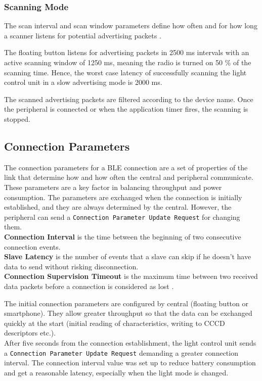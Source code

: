         \subsubsection{Scanning Mode} 
            The scan interval and scan window parameters define how often and for how long a scanner listens for potential advertising packets \cite[20]{ble_book}.
            
            The floating button listens for advertising packets in 2500 ms intervals with an active scanning window of 1250 ms, meaning the radio is turned on 50 \% of the scanning time. 
            Hence, the worst case latency of successfully scanning the light control unit in a slow advertising mode is 2000 ms.
            
            The scanned advertising packets are filtered according to the device name. Once the peripheral is connected or when the application timer fires, the scanning is stopped.
            
    \subsection{Connection Parameters}
        \label{sec:app_connection_parameters}
        The connection parameters for a BLE connection are a set of properties of the link that determine how and how often the central and peripheral communicate. These parameters are a key factor in balancing throughput and power consumption. The parameters are exchanged when the connection is initially established, and they are always determined by the central. However, the peripheral can send a \verb|Connection Parameter Update Request| for changing them.\\
        \textbf{Connection Interval} is the time between the beginning of two consecutive connection events.\\
        \textbf{Slave Latency} is the number of events that a slave can skip if he doesn't have data to send without risking disconnection.\\
        \textbf{Connection Supervision Timeout} is the maximum time between two received data packets before a connection is considered as lost \cite[22--23]{ble_book}.
        

        The initial connection parameters are configured by central (floating button or smartphone). They allow greater throughput so that the data can be exchanged quickly at the start (initial reading of characteristics, writing to CCCD descriptors etc.).\\
        After five seconds from the connection establishment, the light control unit sends a \verb|Connection Parameter Update Request| demanding a greater connection interval. The connection interval value was set up to reduce battery consumption and get a reasonable latency, especially when the light mode is changed.
        
